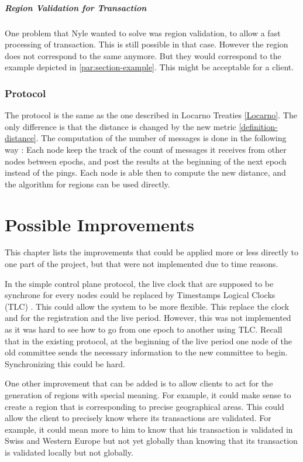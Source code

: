 \documentclass[a4paper,11pt,oneside]{report}
\begin{document}
\paragraph{Region Validation for Transaction}
One problem that Nyle wanted to solve was region validation, to allow a fast
processing of transaction. This is still possible in that case. However the
region does not correspond to the same anymore. But they would correspond to
the example depicted in \autoref{par:section-example}. This might be acceptable
for a client. 

\subsection{Protocol}
The protocol is the same as the one described in Locarno Treaties
\autoref{Locarno}. The only difference is that the distance is changed by the
new metric \autoref{definition-distance}. The computation of the number of
messages is done in the following way : Each node keep the track of the count
of messages it receives from other nodes between epochs, and post the results
at the beginning of the next epoch instead of the pings. Each node is able then
to compute the new distance, and the algorithm for regions can be used
directly.

\chapter{Possible Improvements} \label{chap:Possible Improvements}

This chapter lists the improvements that could be applied more or less directly
to one part of the project, but that were not implemented due to time reasons. 

In the simple control plane protocol, the live clock that are supposed to be
synchrone for every nodes could be replaced by Timestamps Logical Clocks (TLC)
\cite{Ford2019}. This could allow the system to be more flexible.
This replace the clock and for the registration and the live period.
However, this was not implemented as it was hard to see how to go from one
epoch to another using TLC. Recall that in the existing protocol, at the
beginning of the live period one node of the old committee sends the necessary
information to the new committee to begin. Synchronizing this could be hard.

One other improvement that can be added is to allow clients to act for the
generation of regions with special meaning. For example, it could make sense to
create a region that is corresponding to precise geographical areas. This could
allow the client to precisely know where its transactions are validated. For
example, it could mean more to him to know that his transaction is validated in
Swiss and Western Europe but not yet globally than knowing that its transaction
is validated locally but not globally. 
\end{document}
